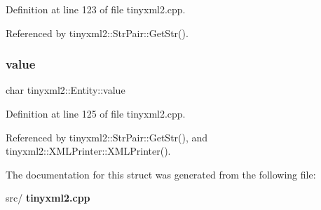 Definition at line 123 of file tinyxml2.\+cpp.



Referenced by tinyxml2\+::\+Str\+Pair\+::\+Get\+Str().

\mbox{\label{structtinyxml2_1_1_entity_a7334e81e33b4615655a403711b24f3ed}} 
\subsubsection{value}
{\footnotesize\ttfamily char tinyxml2\+::\+Entity\+::value}



Definition at line 125 of file tinyxml2.\+cpp.



Referenced by tinyxml2\+::\+Str\+Pair\+::\+Get\+Str(), and tinyxml2\+::\+X\+M\+L\+Printer\+::\+X\+M\+L\+Printer().



The documentation for this struct was generated from the following file\+:\begin{DoxyCompactItemize}
\item 
src/\textbf{ tinyxml2.\+cpp}\end{DoxyCompactItemize}
